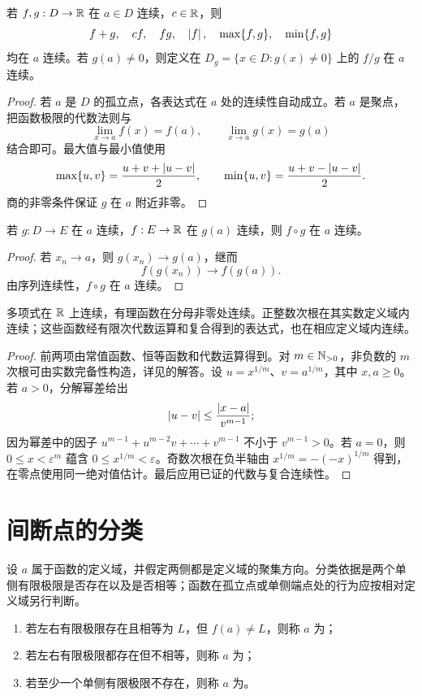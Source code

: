 \begin{theorem}
若 \(f,g:D\to\mathbb{R}\) 在 \(a\in D\) 连续，\(c\in\mathbb{R}\)，则
\[
 f+g,\quad cf,\quad fg,\quad\left|f\right|,\quad
 \max\{f,g\},\quad\min\{f,g\}
\]
均在 \(a\) 连续。若 \(g(a)\ne0\)，则定义在 \(D_g=\{x\in D:g(x)\ne0\}\) 上的 \(f/g\) 在 \(a\) 连续。
\end{theorem}

\begin{proof}
若 \(a\) 是 \(D\) 的孤立点，各表达式在 \(a\) 处的连续性自动成立。若 \(a\) 是聚点，把函数极限的代数法则与
\[
 \lim_{x\to a}f(x)=f(a),\qquad
 \lim_{x\to a}g(x)=g(a)
\]
结合即可。最大值与最小值使用
\[
 \max\{u,v\}=\frac{u+v+\left|u-v\right|}2,\qquad
 \min\{u,v\}=\frac{u+v-\left|u-v\right|}2.
\]
商的非零条件保证 \(g\) 在 \(a\) 附近非零。
\end{proof}

\begin{theorem}[复合连续性]
若 \(g:D\to E\) 在 \(a\) 连续，\(f:E\to\mathbb{R}\) 在 \(g(a)\) 连续，则 \(f\circ g\) 在 \(a\) 连续。
\end{theorem}

\begin{proof}
若 \(x_n\to a\)，则 \(g(x_n)\to g(a)\)，继而
\[
 f(g(x_n))\to f(g(a)).
\]
由序列连续性，\(f\circ g\) 在 \(a\) 连续。
\end{proof}

\begin{corollary}
多项式在 \(\mathbb{R}\) 上连续，有理函数在分母非零处连续。正整数次根在其实数定义域内连续；这些函数经有限次代数运算和复合得到的表达式，也在相应定义域内连续。
\end{corollary}

\begin{proof}
前两项由常值函数、恒等函数和代数运算得到。对 \(m\in\mathbb{N}_{>0}\)，非负数的 \(m\) 次根可由实数完备性构造，详见的解答。设 \(u=x^{1/m}\)、\(v=a^{1/m}\)，其中 \(x,a\ge0\)。若 \(a>0\)，分解幂差给出
\[
 \left|u-v\right|\le\frac{\left|x-a\right|}{v^{m-1}};
\]
因为幂差中的因子 \(u^{m-1}+u^{m-2}v+\cdots+v^{m-1}\) 不小于 \(v^{m-1}>0\)。若 \(a=0\)，则 \(0\le x<\varepsilon^m\) 蕴含 \(0\le x^{1/m}<\varepsilon\)。奇数次根在负半轴由 \(x^{1/m}=-(-x)^{1/m}\) 得到，在零点使用同一绝对值估计。最后应用已证的代数与复合连续性。
\end{proof}

\section{间断点的分类}


设 \(a\) 属于函数的定义域，并假定两侧都是定义域的聚集方向。分类依据是两个单侧有限极限是否存在以及是否相等；函数在孤立点或单侧端点处的行为应按相对定义域另行判断。
\begin{definition}[间断点分类]
\begin{enumerate}
 \item 若左右有限极限存在且相等为 \(L\)，但 \(f(a)\ne L\)，则称 \(a\) 为；
 \item 若左右有限极限都存在但不相等，则称 \(a\) 为；
 \item 若至少一个单侧有限极限不存在，则称 \(a\) 为。
\end{enumerate}
\end{definition}

